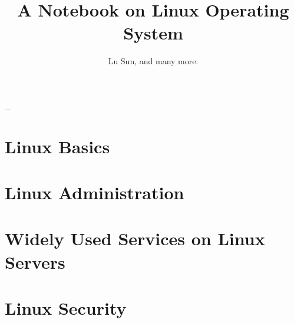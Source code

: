 



\makeindex



\frontmatter

\title{A Notebook on Linux Operating System}
\author{Lu Sun, and many more.}

\maketitle


\tableofcontents


\listoffigures
\listoftables

\mainmatter\_

\part{Linux Basics}







\part{Linux Administration}




\part{Widely Used Services on Linux Servers}
 









\part{Linux Security}



\appendix








\printindex


